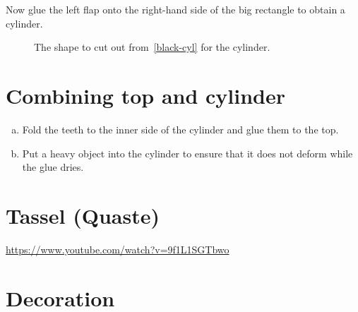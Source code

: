 \documentclass[a4paper,10pt]{article}
\begin{document}
	Now glue the left flap onto the right-hand side of the big rectangle to obtain a cylinder.
	
	\begin{figure}[htb]
		\centering
		\caption{The shape to cut out from~\ref{black-cyl} for the cylinder.}
		\label{fig:cylinder}
	\end{figure}

	\section*{Combining top and cylinder}
	
	\begin{enumerate}[(a)]
		\item Fold the teeth to the inner side of the cylinder and glue them to the top.
		
		\item Put a heavy object into the cylinder to ensure that it does not deform while the glue dries.
	\end{enumerate}

	\section*{Tassel (Quaste)}
	
	\url{https://www.youtube.com/watch?v=9f1L1SGTbwo}


	\section*{Decoration}
	
\end{document}
